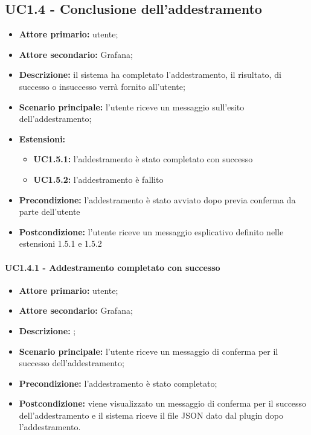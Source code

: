 \documentclass{article}
\begin{document}
	\subsection{UC1.4 - Conclusione dell'addestramento}
	\begin{itemize}
		\item \textbf{Attore primario:} utente;
		\item \textbf{Attore secondario:} Grafana;
		\item \textbf{Descrizione:} il sistema ha completato l'addestramento, il risultato, di successo o insuccesso verrà fornito all'utente;
		\item \textbf{Scenario principale:} l'utente riceve un messaggio sull'esito dell'addestramento;
		
		\item \textbf{Estensioni:}
			\begin{itemize}
				\item \textbf{UC1.5.1:} l'addestramento è stato completato con successo
				\item \textbf{UC1.5.2:} l'addestramento è fallito 
			\end{itemize}
		\item \textbf{Precondizione:} l'addestramento è stato avviato dopo previa conferma da parte dell'utente
		\item \textbf{Postcondizione:} l'utente riceve un messaggio esplicativo definito nelle estensioni 1.5.1 e 1.5.2
	\end{itemize}
	
	\paragraph{UC1.4.1 - Addestramento completato con successo}
	\begin{itemize}
		\item \textbf{Attore primario:} utente;
		\item \textbf{Attore secondario:} Grafana;
		\item \textbf{Descrizione: } ;
		\item \textbf{Scenario principale:} l'utente riceve un messaggio di conferma per il successo dell'addestramento;
		\item \textbf{Precondizione:} l'addestramento è stato completato;
		\item \textbf{Postcondizione:} viene visualizzato un messaggio di conferma per il successo dell'addestramento e il sistema riceve il file JSON dato dal plugin dopo l'addestramento.
	\end{itemize}
\end{document}
